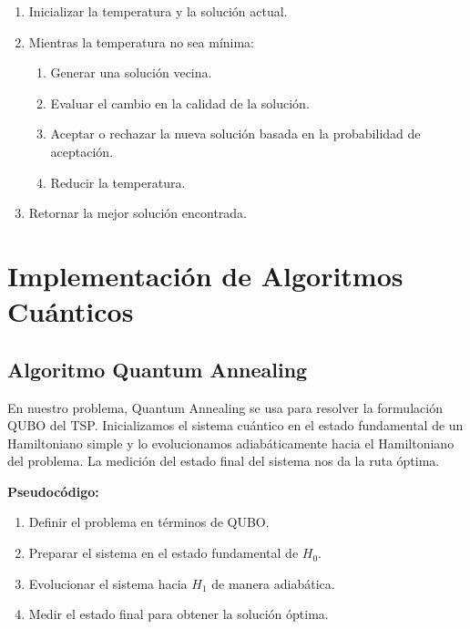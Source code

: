 \documentclass[11pt,a4paper,spanish]{book}
\begin{document}
\begin{tcolorbox}[colback=white!95!blue, colframe=blue!50!black, title=Algoritmo Simulated Annealing (SA), fontupper=\ttfamily]
\begin{spacing}{0.9}
\begin{enumerate}
    \item Inicializar la temperatura y la solución actual.
    \item Mientras la temperatura no sea mínima:
    \begin{enumerate}
        \item Generar una solución vecina.
        \item Evaluar el cambio en la calidad de la solución.
        \item Aceptar o rechazar la nueva solución basada en la probabilidad de aceptación.
        \item Reducir la temperatura.
    \end{enumerate}
    \item Retornar la mejor solución encontrada.
\end{enumerate}
\end{spacing}
\end{tcolorbox}



\section{Implementación de Algoritmos Cuánticos}

\subsection{Algoritmo Quantum Annealing}

En nuestro problema, Quantum Annealing se usa para resolver la formulación QUBO del TSP. Inicializamos el sistema cuántico en el estado fundamental de un Hamiltoniano simple y lo evolucionamos adiabáticamente hacia el Hamiltoniano del problema. La medición del estado final del sistema nos da la ruta óptima.

\textbf{Pseudocódigo:}
\begin{tcolorbox}[colback=white!95!blue, colframe=blue!50!black, title=Quantum Annealing (QA), fontupper=\ttfamily]
\begin{spacing}{0.9}
\begin{enumerate}
    \item Definir el problema en términos de QUBO.
    \item Preparar el sistema en el estado fundamental de \(H_0\).
    \item Evolucionar el sistema hacia \(H_1\) de manera adiabática.
    \item Medir el estado final para obtener la solución óptima.
\end{enumerate}
\end{spacing}
\end{tcolorbox}
\end{document}
